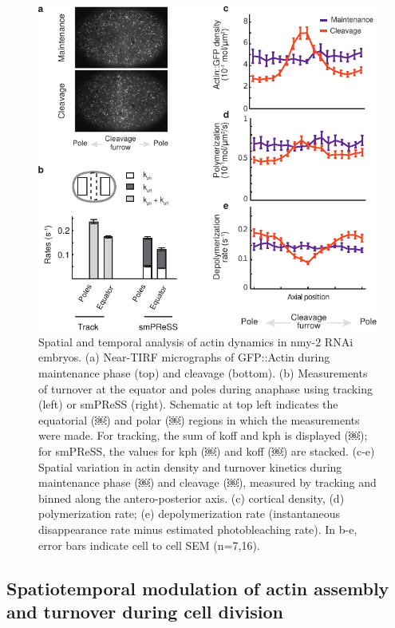  \begin{figure}[h!]
 	\centering
 	\includegraphics[width=0.8\hsize]{nmeth/Fig4}
 	\caption{\label{fig:fig4} Spatial and temporal analysis of actin dynamics in nmy-2 RNAi embryos. (a) Near-TIRF micrographs of GFP::Actin during maintenance phase (top) and cleavage (bottom). (b) Measurements of turnover at the equator and poles during anaphase using tracking (left) or smPReSS (right). Schematic at top left indicates the equatorial (￼) and polar (￼) regions in which the measurements were made. For tracking, the sum of koff and kph is displayed (￼); for smPReSS, the values for kph (￼) and koff (￼) are stacked. (c-e) Spatial variation in actin density and turnover kinetics during maintenance phase (￼) and cleavage (￼), measured by tracking and binned along the antero-posterior axis. (c) cortical density, (d) polymerization rate; (e) depolymerization rate (instantaneous disappearance rate minus estimated photobleaching rate). In b-e, error bars indicate cell to cell SEM (n=7,16). }
 \end{figure}
 
 
 
 \subsection{Spatiotemporal modulation of actin assembly and turnover during cell division}
 
